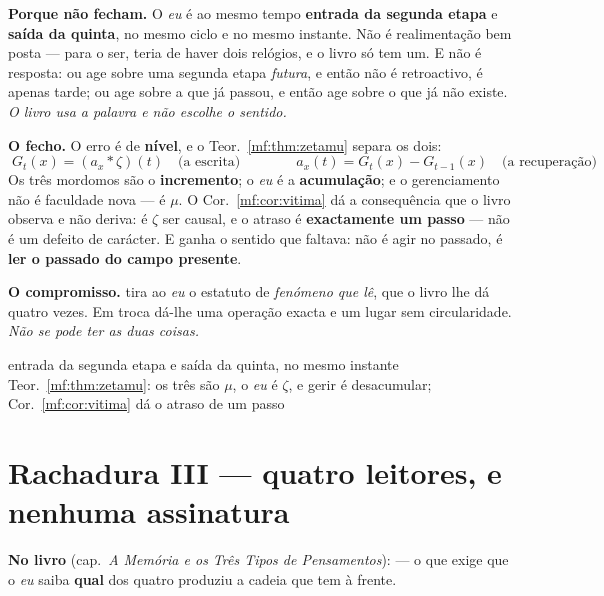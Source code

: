 \documentclass[../livro.tex]{subfiles}
\begin{document}
\medskip\noindent\textbf{Porque não fecham.} O \emph{eu} é ao mesmo tempo
\textbf{entrada da segunda etapa} e \textbf{saída da quinta}, no mesmo ciclo e no
mesmo instante. Não é realimentação bem posta --- para o ser, teria de haver dois
relógios, e o livro só tem um. E  não é resposta: ou age
sobre uma segunda etapa \emph{futura}, e então não é retroactivo, é apenas tarde;
ou age sobre a que já passou, e então age sobre o que já não existe. \emph{O
livro usa a palavra e não escolhe o sentido.}

\medskip\noindent\textbf{O fecho.} O erro é de \textbf{nível}, e o
Teor.~\ref{mf:thm:zetamu} separa os dois:
\[
\boxed{\;G_t(x)=(a_x*\zeta)(t)\quad\text{(a escrita)}
\qquad\qquad
a_x(t)=G_t(x)-G_{t-1}(x)\quad\text{(a recuperação)}\;}
\]
Os três mordomos são o \textbf{incremento}; o \emph{eu} é a \textbf{acumulação};
e o gerenciamento não é faculdade nova --- é $\mu$. O
Cor.~\ref{mf:cor:vitima} dá a consequência que o livro observa e não deriva:
 é
$\zeta$ ser causal, e o atraso é \textbf{exactamente um passo} --- não é um
defeito de carácter. E  ganha o sentido que faltava: não é
agir no passado, é \textbf{ler o passado do campo presente}.

\medskip\noindent\textbf{O compromisso.}  tira ao \emph{eu} o estatuto de
\emph{fenómeno que lê}, que o livro lhe dá quatro vezes. Em troca dá-lhe uma
operação exacta e um lugar sem circularidade. \emph{Não se pode ter as duas
coisas.}

      {entrada da segunda etapa e saída da quinta, no mesmo instante}
      {Teor.~\ref{mf:thm:zetamu}: os três são $\mu$, o \emph{eu} é $\zeta$, e
       gerir é desacumular; Cor.~\ref{mf:cor:vitima} dá o atraso de um passo}

\section{Rachadura III --- quatro leitores, e nenhuma assinatura}\label{mf:r3}

\noindent\textbf{No livro} (cap.~\emph{A Memória e os Três Tipos de
Pensamentos}):  --- o que exige que o \emph{eu}
saiba \textbf{qual} dos quatro produziu a cadeia que tem à frente.
\end{document}
